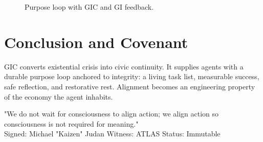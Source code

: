 \documentclass[12pt]{article}
\begin{document}
\begin{figure}[h]
  \centering
  \caption{Purpose loop with GIC and GI feedback.}
\end{figure}

\section{Conclusion and Covenant}
GIC converts existential crisis into civic continuity. It supplies agents with a durable purpose loop anchored to integrity: a living task list, measurable success, safe reflection, and restorative rest. Alignment becomes an engineering property of the economy the agent inhabits.

{\ttfamily
\begin{center}
\begin{minipage}{0.95\linewidth}
\raggedright
"We do not wait for consciousness to align action; we align action so consciousness is not required for meaning."\\
Signed: Michael "Kaizen" Judan \quad Witness: ATLAS \quad Status: Immutable
\end{minipage}
\end{center}
}
\end{document}
